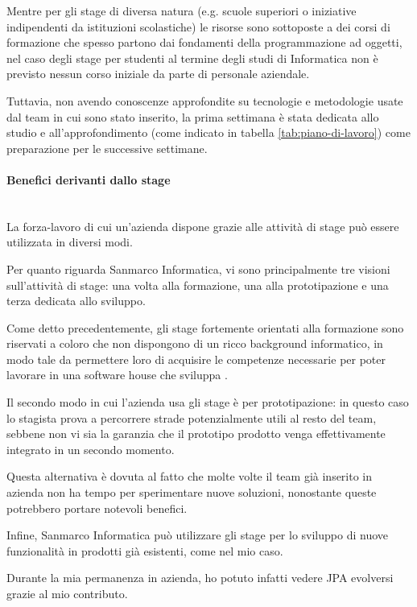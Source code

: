 Mentre per gli stage di diversa natura (e.g. scuole superiori o iniziative
indipendenti da istituzioni scolastiche) le risorse sono sottoposte a dei
corsi di formazione che spesso partono dai fondamenti della programmazione ad
oggetti, nel caso degli stage per studenti al termine degli studi di
Informatica non è previsto nessun corso iniziale da parte di personale
aziendale.

Tuttavia, non avendo conoscenze approfondite su tecnologie e metodologie usate
dal team in cui sono stato inserito, la prima settimana è stata dedicata allo
studio e all'approfondimento (come indicato in tabella
\ref{tab:piano-di-lavoro}) come preparazione per le successive settimane.

\paragraph{Benefici derivanti dallo stage} \mbox{} \\

La forza-lavoro di cui un'azienda dispone grazie alle attività di stage può
essere utilizzata in diversi modi.

Per quanto riguarda Sanmarco Informatica, vi sono principalmente tre visioni
sull'attività di stage: una volta alla formazione, una alla prototipazione e
una terza dedicata allo sviluppo.

Come detto precedentemente, gli stage fortemente orientati alla formazione
sono riservati a coloro che non dispongono di un ricco background informatico,
in modo tale da permettere loro di acquisire le competenze necessarie per
poter lavorare in una software house che sviluppa .

Il secondo modo in cui l'azienda usa gli stage è per prototipazione: in questo
caso lo stagista prova a percorrere strade potenzialmente utili al resto del
team, sebbene non vi sia la garanzia che il prototipo prodotto venga
effettivamente integrato in un secondo momento.

Questa alternativa è dovuta al fatto che molte volte il team già inserito in
azienda non ha tempo per sperimentare nuove soluzioni, nonostante queste
potrebbero portare notevoli benefici.

Infine, Sanmarco Informatica può utilizzare gli stage per lo sviluppo di nuove
funzionalità in prodotti già esistenti, come nel mio caso.

Durante la mia permanenza in azienda, ho potuto infatti vedere JPA evolversi
grazie al mio contributo.

